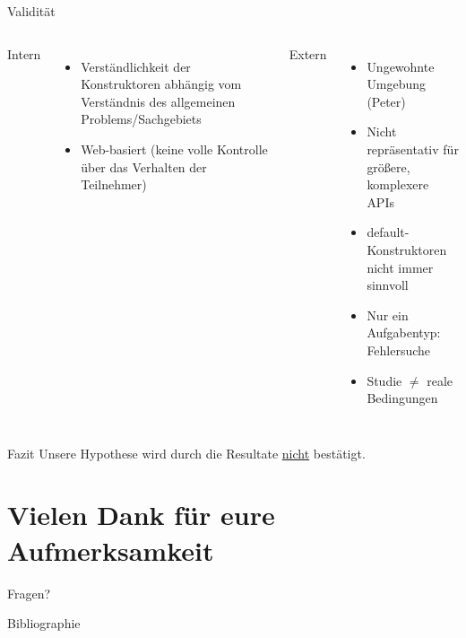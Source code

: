 \documentclass[10pt]{beamer}
\begin{document}
	\begin{frame}{Validität}
		\begin{columns}[T,onlytextwidth]
	
			Intern
			\begin{itemize}
				\item Verständlichkeit der Konstruktoren abhängig vom Verständnis des allgemeinen Problems/Sachgebiets
				\item Web-basiert (keine volle Kontrolle über das Verhalten der Teilnehmer)
			\end{itemize}
		
			Extern
			\begin{itemize}
				\item Ungewohnte Umgebung (Peter)
				\item Nicht repräsentativ für größere, komplexere APIs
				\item default-Konstruktoren nicht immer sinnvoll
				\item Nur ein Aufgabentyp: Fehlersuche
				\item Studie $\neq$ reale Bedingungen
			\end{itemize}
		\end{columns}	
	
	\end{frame}
	
	\begin{frame}[standout]{Fazit}
		Unsere Hypothese wird durch die Resultate \underline{nicht} bestätigt.
	\end{frame}

\section{Vielen Dank für eure Aufmerksamkeit}

\appendix

	\begin{frame}[standout]
		Fragen?
	\end{frame}

	\begin{frame}[allowframebreaks]{Bibliographie}
		
		
	\end{frame}
\end{document}
